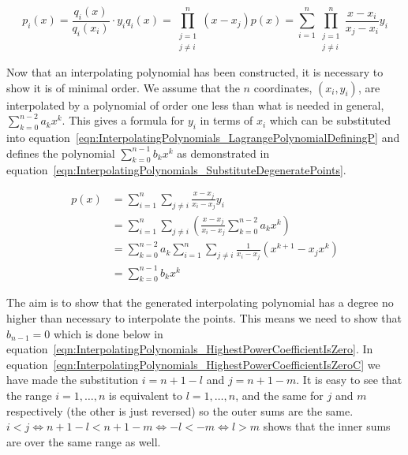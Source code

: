 \begin{subequations}
	\begin{equation}
		p_i(x) = \frac{q_i(x)}{q_i(x_i)} \cdot y_i
		\label{eqn:InterpolatingPolynomials_LagrangePolynomialDefiningPi}
	\end{equation}
	\begin{equation}
		q_i(x) = \prod_{\substack{j=1 \\ j \ne i}}^n (x - x_j)
		\label{eqn:InterpolatingPolynomials_LagrangePolynomialDefiningQi}
	\end{equation}
	\begin{equation}
	p(x) = \sum_{i=1}^n \prod_{\substack{j=1 \\ j \ne i}}^n \frac{x - x_i}{x_j - x_i} y_i
	\label{eqn:InterpolatingPolynomials_LagrangePolynomialDefiningP}
	\end{equation}
\end{subequations}

Now that an interpolating polynomial has been constructed, it is necessary to show it is of minimal order. We assume that the $n$ coordinates, $(x_i, y_i)$, are interpolated by a polynomial of order one less than what is needed in general, $\sum_{k=0}^{n-2} a_k x^k$. This gives a formula for $y_i$ in terms of $x_i$ which can be substituted into equation~\eqref{eqn:InterpolatingPolynomials_LagrangePolynomialDefiningP} and defines the polynomial $\sum_{k=0}^{n-1} b_k x^k$ as demonstrated in equation~\eqref{eqn:InterpolatingPolynomials_SubstituteDegeneratePoints}.

\begin{subequations}
	\begin{align}
		p(x) &= \sum_{i=1}^n \sum_{j \ne i} \frac{x - x_j}{x_i - x_j} y_i  \\
		&= \sum_{i=1}^n \sum_{j \ne i} \left( \frac{x - x_j}{x_i - x_j} \sum_{k=0}^{n-2} a_k x^k \right)  \\
		&= \sum_{k=0}^{n-2} a_k \sum_{i=1}^n \sum_{j \ne i} \frac{1}{x_i - x_j} (x^{k+1} - x_j x^k)  \\
		&= \sum_{k=0}^{n-1} b_k x^k
	\end{align}
	\label{eqn:InterpolatingPolynomials_SubstituteDegeneratePoints}
\end{subequations}

The aim is to show that the generated interpolating polynomial has a degree no higher than necessary to interpolate the points. This means we need to show that $b_{n-1} = 0$ which is done below in equation~\eqref{eqn:InterpolatingPolynomials_HighestPowerCoefficientIsZero}. In equation~\eqref{eqn:InterpolatingPolynomials_HighestPowerCoefficientIsZeroC} we have made the substitution $i = n + 1 - l$ and $j = n + 1 - m$. It is easy to see that the range $i = 1, \dots, n$ is equivalent to $l = 1, \dots, n$, and the same for $j$ and $m$ respectively (the other is just reversed) so the outer sums are the same. $i < j \iff n + 1 - l < n + 1 - m \iff -l < -m \iff l > m$ shows that the inner sums are over the same range as well.

